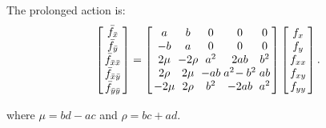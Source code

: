 \documentclass[review,onefignum,onetabnum]{siamonline190516}
\begin{document}
{The prolonged action is:
\begin{equation}
\arraycolsep=1.4pt
\left[
\begin{array}{c}
  \bar f_{\bar x} \\ \bar f_{\bar y} \\ \bar f_{\bar x \bar x} \\ \bar f_{\bar x \bar y} \\ \bar f_{\bar y \bar y} 
 \end{array}
 \right]
 = 
\left[
\begin{array}{ccccc}
 a & b & 0 & 0 & 0 \\
 -b & a & 0 & 0 & 0 \\
 2\mu & -2 \rho & a^2 & 2 a b & b^2 \\
 2 \rho & 2\mu & -a b & a^2\!-b^2 & a b \\
 -2\mu & 2 \rho & b^2 & -2 a b & a^2 \\
\end{array}
\right]\left[
\begin{array}{c}
f_x \\ f_y \\ f_{xx} \\ f_{xy} \\ f_{yy} \\
 \end{array}
 \right].
\label{eqn:mobius}
 \end{equation}

\noindent where $\mu = b d - a c$ and $\rho = b c + a d$.

}
\end{document}
